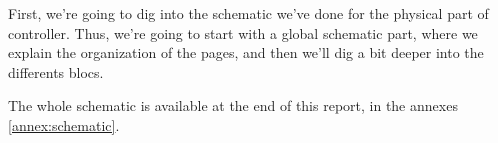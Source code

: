 First, we're going to dig into the schematic we've done for the physical part
of controller. Thus, we're going to start with a global schematic part, where
we explain the organization of the pages, and then we'll dig a bit deeper into
the differents blocs.

The whole schematic is available at the end of this report, in the annexes
\ref{annex:schematic}.







